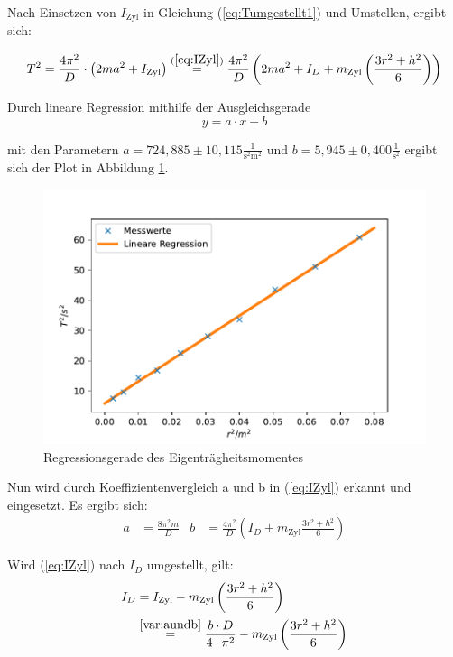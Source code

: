 Nach Einsetzen von $I_{\text{Zyl}}$ in Gleichung (\ref{eq:Tumgestellt1}) und Umstellen, ergibt sich:

\begin{equation}
  T^2 = \frac{4 \pi^2}{D} \cdot \left( 2ma^2 + I_{\text{Zyl}} \right) \stackrel{(\ref{eq:IZyl})}{=} 
  \frac{4 \pi^2}{D} \left( 2ma^2 + I_{D} + m_{\text{Zyl}}  \left( \frac{3 r^2 + h^2}{6} \right) \right)
\end{equation}

Durch lineare Regression mithilfe der Ausgleichsgerade 
\begin{equation*}
  y = a \cdot x + b 
\end{equation*}

mit den Parametern $a = 724,885 ± 10,115 \frac{1}{\unit{\square\second\square\meter}}$ und $b = 5,945 ± 0,400\frac{1}{\unit{\square\second}}$ ergibt sich der Plot in Abbildung \ref{fig:Lineareregression}.

\begin{figure}[H]
  \centering
  \includegraphics{pictures/Lineare Regression.pdf}
  \caption{Regressionsgerade des Eigenträgheitsmomentes}
  \label{fig:Lineareregression}
\end{figure}

Nun wird durch Koeffizientenvergleich a und b in (\ref{eq:IZyl}) erkannt und eingesetzt.
Es ergibt sich:
\begin{align} \label{var:aundb}
  a & = \frac{8 \pi^2 m}{D} & b & = \frac{4 \pi^2}{D} \left(I_{D} + m_{\text{Zyl}} \frac{3 r^2 + h^2}{6} \right)
\end{align}

Wird (\ref{eq:IZyl}) nach $I_{D}$ umgestellt, gilt:
\begin{equation} \label{eq:idgauß}  %
  \begin{split}
  I_{D} {} &= I_{\text{Zyl}} - m_{\text{Zyl}}  \left( \frac{3 r^2 + h^2}{6} \right) \\
    &\stackrel{\ref{var:aundb}}{=} \frac{b \cdot D}{4 \cdot \pi^2} - m_{\text{Zyl}}  \left( \frac{3 r^2 + h^2}{6} \right)
  \end{split}
\end{equation}

